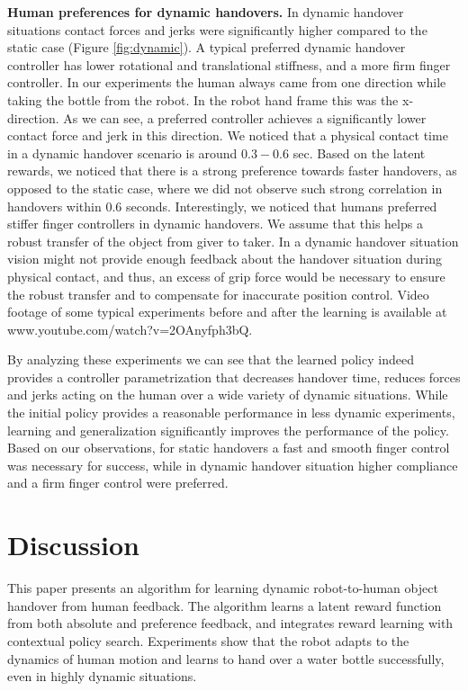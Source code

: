 \textbf{Human preferences for dynamic handovers.} In dynamic handover situations contact forces and jerks were significantly higher compared to the static case (Figure \ref{fig:dynamic}). A typical preferred dynamic handover controller has lower rotational and translational stiffness,  and  a more firm finger controller. In our experiments the human always came from one direction while taking the bottle from the robot. In the robot hand frame this was the x-direction. As we can see, a preferred controller achieves a significantly lower contact force and jerk in this direction. We noticed that a physical contact time in a dynamic handover  scenario is around $0.3-0.6$ sec. Based on the latent rewards, we noticed that there is a strong preference towards faster handovers, as opposed to the static case, where we did not observe such strong correlation in handovers within $0.6$ seconds. Interestingly,  we noticed that humans preferred stiffer finger controllers in dynamic handovers. We assume that this helps a robust transfer of the object from giver to taker. In a dynamic handover situation vision might not provide enough feedback about the handover situation during physical contact, and thus, an excess of grip force would be necessary to ensure the robust transfer and to compensate for inaccurate position control. Video footage of some typical experiments before and after the learning is available at   www.youtube.com/watch?v=2OAnyfph3bQ.

 By analyzing these experiments we can see that the learned policy indeed provides a controller parametrization that decreases handover time, reduces forces and jerks acting on the human over a wide variety of dynamic situations. While the initial policy provides a reasonable performance in less dynamic experiments, learning and generalization significantly improves the performance of the policy. Based on our observations, for static handovers a fast and smooth finger control was necessary for success, while in dynamic handover situation higher compliance and a firm finger control were preferred. 

\section{Discussion}
This paper presents an algorithm for learning dynamic robot-to-human object handover from human feedback. The algorithm learns a latent reward function from both absolute and preference feedback, and integrates reward learning with contextual policy search.  Experiments show that the robot adapts to the dynamics of human motion and learns to hand over a water bottle successfully, even in highly dynamic situations.

